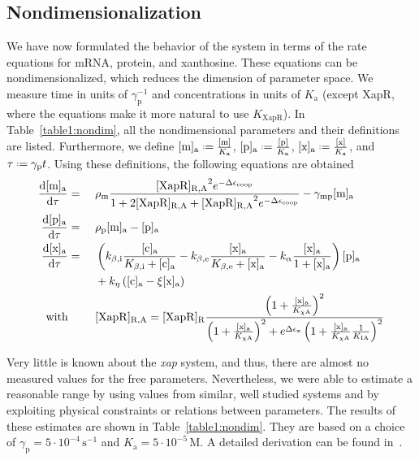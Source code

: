 \documentclass[10pt,letterpaper]{article}
\newcommand{\unit}[1]{\,\mathrm{#1}}
\newcommand{\n}[1]{\mathrm{#1}}
\newcommand{\dd}[2]{\frac{\mathrm{d} #1}{\mathrm{d} #2}}
\newcommand*{\defeq}{\mathrel{\vcenter{\baselineskip0.5ex \lineskiplimit0pt
			\hbox{\scriptsize.}\hbox{\scriptsize.}}}%
	=}
\begin{document}
	\subsection*{Nondimensionalization}
	We have now formulated the behavior of the system in terms of the rate
	equations for mRNA, protein, and xanthosine. These equations can be
	nondimensionalized, which reduces the dimension of parameter space. We
	measure time in units of $\gamma_{\n{p}}^{-1}$ and concentrations in units
	of $K_{\n{a}}$ (except XapR, where the equations make it more natural to use
	$K_{\n{XapR}}$). In Table~\ref{table1:nondim}, all the nondimensional
	parameters and their definitions are listed. Furthermore, we define
	$\n{[m]_a} \defeq \frac{\n{[m]}}{K_{\n{a}}}$, $\n{[p]_a} \defeq
	\frac{\n{[p]}}{K_{\n{a}}}$, $\n{[x]_a} \defeq \frac{\n{[x]}}{K_{\n{a}}}$,
	and $\tau \defeq \gamma_{\n{p}} t$. Using these definitions, the following
	equations are obtained
	\begin{alignat}{2}
	\dd{\mathrm{[m]_a}}{\tau} &= \ &&
	\rho_{\n{m}} 
	\frac{
		\mathrm{[XapR]_{R,A}}^2 
		e^{- \Delta \epsilon_{\text{coop}}}
	}{
		1 + 
		2 \mathrm{[XapR]_{R,A}} +
		\mathrm{[XapR]_{R,A}}^2 e^{- \Delta \epsilon_{\text{coop}}}
	}
	- \gamma_{\n{mp}} \mathrm{[m]_a}
	\\
	\dd{\mathrm{[p]_a}}{\tau} &= \ &&
	\rho_{\n{p}} \mathrm{[m]_a}
	- \mathrm{[p]_a}
	\\
	\dd{\mathrm{[x]_a}}{\tau} &= \ && \left(k_{\n{\beta,i}} \frac{\n{[c]_a}}{K_{\n{\beta,i}} + \n{[c]_a}} - k_{\n{\beta,e}} \frac{\n{[x]_a}}{K_{\n{\beta,e}} + \n{[x]_a}} - k_{\n{\alpha}} \frac{\n{[x]_a}}{1 + \n{[x]_a}}\right) \mathrm{[p]_a} \\ & && + k_{\n{\eta}} \left(\mathrm{[c]_a} - \xi \mathrm{[x]_a}\right)
	\nonumber \\
	\text{with} & && \raggedleft [\n{XapR}]_{\mathrm{R,\n{A}}} = [\n{XapR}]_{\mathrm{R}} \frac{\left(1 + \frac{\mathrm{[x]_{\n{a}}}}{K_{\n{\chi A}}}\right)^2}{\left(1 + \frac{\mathrm{[x]_{\n{a}}}}{K_{\n{\chi A}}}\right)^2 + e^{\Delta \epsilon_{\n{x}}} \left(1+\frac{\mathrm{[x]_{\n{a}}}}{K_{\n{\chi A}}} \frac{1}{K_{\n{IA}}}\right)^2} \nonumber
	\end{alignat}
	
	Very little is known about the \emph{xap} system, and thus, there are almost no
	measured values for the free parameters. Nevertheless, we were able to
	estimate a reasonable range by using values from similar, well studied
	systems and by exploiting physical constraints or relations between parameters.
	The results of these estimates are shown in Table~\ref{table1:nondim}. They
	are based on a choice of $\gamma_{\n{p}} = 5 \cdot 10^{-4} \unit{s^{-1}}$
	and $K_{\n{a}} = 5 \cdot 10^{-5} \unit{M}$. A detailed derivation can be
	found in~. 
	
\end{document}
